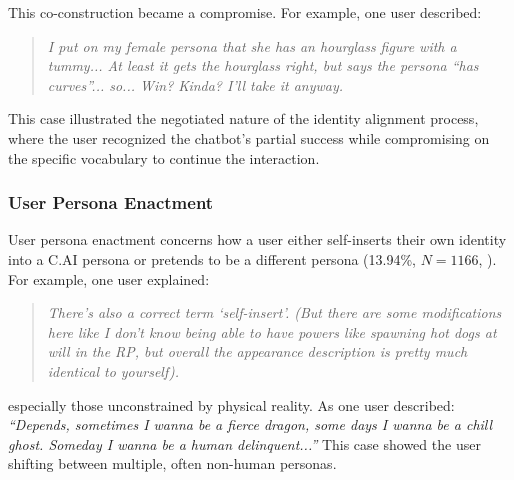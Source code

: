 \documentclass[sigconf, nonacm]{acmart}
\newcommand{\implications}[1]{{\color{black}{#1}}}
\newcommand{\newfinding}[1]{{\color{black}{#1}}}
\begin{document}
\newfinding{When faced with partial misalignment, users often engaged in negotiation, accepting approximations of their intended identity.} This co-construction became a compromise. For example, one user described:

\begin{quote} \textit{I put on my female persona that she has an hourglass figure with a tummy... At least it gets the hourglass right, but says the persona ``has curves''... so... Win? Kinda? I'll take it anyway.} \end{quote}

This case illustrated the negotiated nature of the identity alignment process, where the user recognized the chatbot's partial success while compromising on the specific vocabulary to continue the interaction.

\subsubsection{User Persona Enactment}
\label{UserPersonaEnactment}
User persona enactment concerns how a user either self-inserts their own identity into a C.AI persona or pretends to be a different persona (13.94\%, $N=1166$, \implications{or 5.21\% of all posts}). \newfinding{Some users enacted a ``self-insert'' persona, basing it on their real-world identity but adding fictional traits.} For example, one user explained:

\begin{quote} \textit{There's also a correct term ‘self-insert'. (But there are some modifications here like I don't know being able to have powers like spawning hot dogs at will in the RP, but overall the appearance description is pretty much identical to yourself).} \end{quote}

\newfinding{This user's modification, adding the power to ``spawn[...] hot dogs at will,'' blended a personally relatable self-insert with fantastical elements.} \newfinding{This blending of the real and the fantastical was a common way for users to enact a persona that was an extension of their real identity, but modified for specific narrative or humorous purposes.} \newfinding{Other users enacted C.AI personas that were distinct from their offline selves,} especially those unconstrained by physical reality. As one user described: \textit{``Depends, sometimes I wanna be a fierce dragon, some days I wanna be a chill ghost. Someday I wanna be a human delinquent...''} This case showed the user shifting between multiple, often non-human personas.
\end{document}
